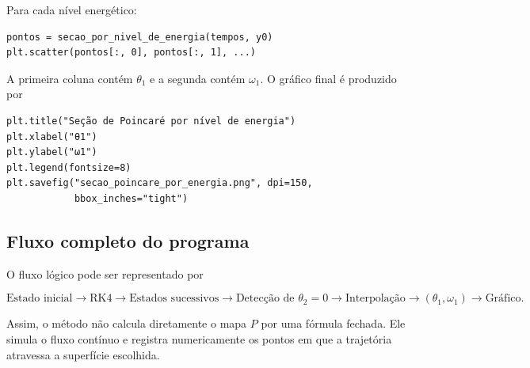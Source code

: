\documentclass[12pt,a4paper]{article}
\begin{document}
Para cada nível energético:

\begin{lstlisting}
pontos = secao_por_nivel_de_energia(tempos, y0)
plt.scatter(pontos[:, 0], pontos[:, 1], ...)
\end{lstlisting}

A primeira coluna contém $\theta_1$ e a segunda contém $\omega_1$. O gráfico final é produzido por

\begin{lstlisting}
plt.title("Seção de Poincaré por nível de energia")
plt.xlabel("θ1")
plt.ylabel("ω1")
plt.legend(fontsize=8)
plt.savefig("secao_poincare_por_energia.png", dpi=150,
            bbox_inches="tight")
\end{lstlisting}

\subsection{Fluxo completo do programa}

O fluxo lógico pode ser representado por

\begin{equation}
\text{Estado inicial}
\rightarrow
\text{RK4}
\rightarrow
\text{Estados sucessivos}
\rightarrow
\text{Detecção de }\theta_2=0
\rightarrow
\text{Interpolação}
\rightarrow
(\theta_1,\omega_1)
\rightarrow
\text{Gráfico.}
\end{equation}

Assim, o método não calcula diretamente o mapa $P$ por uma fórmula fechada. Ele simula o fluxo contínuo e registra numericamente os pontos em que a trajetória atravessa a superfície escolhida.
\end{document}
